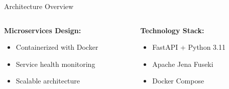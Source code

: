 \documentclass[aspectratio=169]{beamer}
\begin{document}
\begin{frame}{Architecture Overview}
    \begin{columns}[c]
        \begin{column}{0.5\textwidth}
            \textbf{Microservices Design:}
            \begin{itemize}
                \item Containerized with Docker
                \item Service health monitoring
                \item Scalable architecture
            \end{itemize}
        \end{column}
        \begin{column}{0.5\textwidth}
            \textbf{Technology Stack:}
            \begin{itemize}
                \item FastAPI + Python 3.11
                \item Apache Jena Fuseki
                \item Docker Compose
            \end{itemize}
        \end{column}
    \end{columns}
\end{frame}
\end{document}
